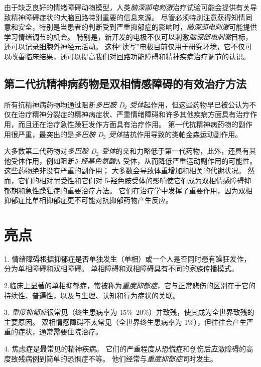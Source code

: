 由于缺乏良好的情绪障碍动物模型，人类\textit{脑深部电刺激}治疗试验可能会提供有关导致精神障碍症状的大脑回路特别重要的信息来源。
尽管必须特别注意获得知情同意和安全，特别是当患者的判断受到严重抑郁症的影响时，\textit{脑深部电刺激}可能提供学习情绪调节的机会。
特别是，新开发的电极不仅可以刺激\textit{脑深部电刺激}目标，还可以记录细胞外神经元活动。
这种“读写”电极目前仅用于研究环境，它不仅可以改善临床结果，还可以提高我们对回路功能障碍和精神疾病治疗调节的认识。



\subsection{第二代抗精神病药物是双相情感障碍的有效治疗方法}

所有抗精神病药物均通过阻断\textit{多巴胺 D$_2$ 受体}起作用，但这些药物早已被公认为不仅在治疗精神分裂症的精神病症状、严重情绪障碍和许多其他疾病方面具有治疗作用，而且还在治疗急性躁狂发作方面具有治疗作用。
第一代抗精神病药物的副作用很严重，最突出的是\textit{多巴胺 D$_2$ 受体}拮抗作用导致的类帕金森运动副作用。


大多数第二代药物对\textit{多巴胺 D$_2$ 受体}的亲和力略低于第一代药物，此外，还具有其他受体作用，例如阻断\textit{5-羟基色氨酸}A 受体，从而降低严重运动副作用的可能性。
这些药物绝非没有严重的副作用；
大多数会导致体重增加和相关的代谢状况。
然而，它们的相对耐受性和它们对 5-羟色胺受体的影响使它们成为双相情感障碍抑郁期和急性躁狂症的重要治疗方法。
它们在治疗学中发挥了重要作用，因为双相抑郁症比单相抑郁症更不可能对抗抑郁药物产生反应。



\section{亮点}

1. 情绪障碍根据抑郁症是否单独发生（单相）或一个人是否同时患有躁狂发作，分为单相障碍和双相障碍。
单相障碍和双相障碍具有不同的家族传播模式。 


2.临床上显著的单相抑郁症，常被称为\textit{重度抑郁症}，它与正常悲伤的区别在于它的持续性、普遍性，以及与生理、认知和行为症状的关联。


3. \textit{重度抑郁症}很常见（终生患病率为 15\%–20\%）并致残，使其成为全世界致残的主要原因。
双相情感障碍不太常见（全世界终生患病率为 1\%），但往往会产生严重的症状，通常需要住院治疗。 


4. 焦虑症是最常见的精神疾病。
它们的严重程度从恐慌症和创伤后应激障碍的高度致残病例到简单的恐惧症不等。
他们经常与\textit{重度抑郁症}同时发生。


